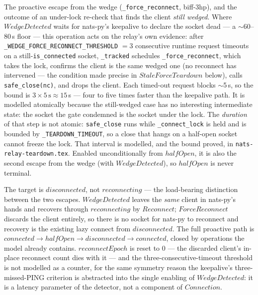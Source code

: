 \documentclass[a4paper,10pt,fleqn]{article}
\begin{document}
The proactive escape from the wedge (\texttt{\_force\_reconnect},
biff-3hp), and the outcome of an under-lock re-check that finds the
client \emph{still wedged}.  Where $WedgeDetected$ waits for nats-py's
keepalive to declare the socket dead --- a $\sim$60--80\,s floor ---
this operation acts on the relay's own evidence: after
\texttt{\_WEDGE\_FORCE\_RECONNECT\_THRESHOLD} $= 3$ consecutive runtime
request timeouts on a still-\texttt{is\_connected} socket,
\texttt{\_tracked} schedules \texttt{\_force\_reconnect}, which takes the
lock, confirms the client is the same wedged one (no reconnect has
intervened --- the condition made precise in $StaleForceTeardown$
below), calls \texttt{safe\_close(nc)}, and drops the client.  Each
timed-out request blocks $\sim$5\,s, so the bound is $3 \times
5\,\mathrm{s} \approx 15\,$s --- four to five times faster than the
keepalive path.  It is modelled atomically because the still-wedged case
has no interesting intermediate state: the socket the gate condemned is
the socket under the lock.  The \emph{duration} of that step is not
atomic: \texttt{safe\_close} runs while \texttt{\_connect\_lock} is held and
is bounded by \texttt{\_TEARDOWN\_TIMEOUT}, so a close that hangs on a
half-open socket cannot freeze the lock.  That interval is modelled, and
the bound proved, in \texttt{nats-relay-teardown.tex}.  Enabled
unconditionally from $halfOpen$, it
is also the second escape from the wedge (with $WedgeDetected$), so
$halfOpen$ is never terminal.

The target is $disconnected$, not $reconnecting$ --- the load-bearing
distinction between the two escapes.  $WedgeDetected$ leaves the
\emph{same} client in nats-py's hands and recovers through
$reconnecting$ by $Reconnect$; $ForceReconnect$ discards the client
entirely, so there is no socket for nats-py to reconnect and recovery is
the existing lazy connect from $disconnected$.  The full proactive path
is $connected \to halfOpen \to disconnected \to connected$, closed by
operations the model already contains.  $reconnectEpoch$ is reset to $0$
--- the discarded client's in-place reconnect count dies with it --- and
the three-consecutive-timeout threshold is not modelled as a counter,
for the same symmetry reason the keepalive's three-missed-PING criterion
is abstracted into the single enabling of $WedgeDetected$: it is a
latency parameter of the detector, not a component of $Connection$.
\end{document}
